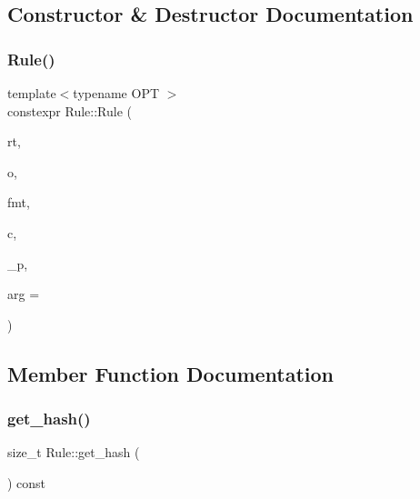 \subsection{Constructor \& Destructor Documentation}
\mbox{\label{class_rule_ad25d1676e2ec236dfea8469f052c0985}} 
\subsubsection{\texorpdfstring{Rule()}{Rule()}}
{\footnotesize\ttfamily template$<$typename O\+PT $>$ \\
constexpr Rule\+::\+Rule (\begin{DoxyParamCaption}\item[{const \hyperlink{_nonterminal_8h_a5c1f658dc7560600a16d22408bd716ca}{nonterminal\+\_\+t}}]{rt,  }\item[{const O\+PT}]{o,  }\item[{const char $\ast$}]{fmt,  }\item[{std\+::initializer\+\_\+list$<$ \hyperlink{_nonterminal_8h_a5c1f658dc7560600a16d22408bd716ca}{nonterminal\+\_\+t} $>$}]{c,  }\item[{double}]{\+\_\+p,  }\item[{const int}]{arg = {} }\end{DoxyParamCaption})\hspace{0.3cm}{\ttfamily [inline]}}



\subsection{Member Function Documentation}
\mbox{\label{class_rule_a62e4d931266a65d4aad9ca3c058d7e25}} 
\subsubsection{\texorpdfstring{get\+\_\+hash()}{get\_hash()}}
{\footnotesize\ttfamily size\+\_\+t Rule\+::get\+\_\+hash (\begin{DoxyParamCaption}{ }\end{DoxyParamCaption}) const\hspace{0.3cm}{\ttfamily [inline]}}

\mbox{\label{class_rule_a9d557e302f94bd85f5505733e8856f97}} 
